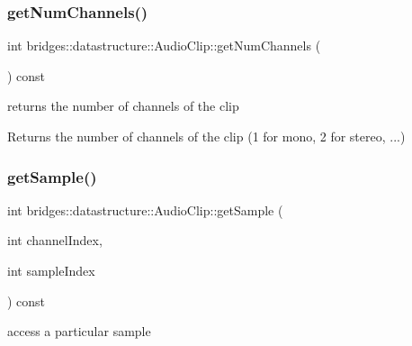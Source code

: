 \subsubsection{\texorpdfstring{get\+Num\+Channels()}{getNumChannels()}}
{\footnotesize\ttfamily int bridges\+::datastructure\+::\+Audio\+Clip\+::get\+Num\+Channels (\begin{DoxyParamCaption}{ }\end{DoxyParamCaption}) const\hspace{0.3cm}{\ttfamily [inline]}}



returns the number of channels of the clip 

\begin{DoxyReturn}{Returns}
the number of channels of the clip (1 for mono, 2 for stereo, ...) 
\end{DoxyReturn}
\mbox{\label{classbridges_1_1datastructure_1_1_audio_clip_a24bd273de32369cb9d979e7250759717}} 
\subsubsection{\texorpdfstring{get\+Sample()}{getSample()}}
{\footnotesize\ttfamily int bridges\+::datastructure\+::\+Audio\+Clip\+::get\+Sample (\begin{DoxyParamCaption}\item[{int}]{channel\+Index,  }\item[{int}]{sample\+Index }\end{DoxyParamCaption}) const\hspace{0.3cm}{\ttfamily [inline]}}



access a particular sample 


